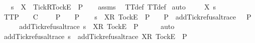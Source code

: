 \ \ \ {\isachardoublequoteopen}s\ {\isacharat}\ {\isacharbrackleft}{\isacharbrackleft}X\ {\isasymunion}\ {\isacharbraceleft}Tick{\isacharbraceright}{\isacharbrackright}\isactrlsub R{\isacharcomma}{\isacharbrackleft}Tock{\isacharbrackright}\isactrlsub E{\isacharbrackright}\ {\isasymin}\ P{\isachardoublequoteclose}\isanewline
%
\isadelimproof
\ \ %
\endisadelimproof
%
\isatagproof
{}\isamarkupfalse%
\ assms\ \isamarkupfalse%
\ TT{}{\isacharunderscore}def\ TT{}{\isacharunderscore}def\isanewline
{}\isamarkupfalse%
\ {\isacharparenleft}auto{\isacharparenright}\isanewline
\ \ \isamarkupfalse%
\ {\isasymrho}\ X\ s\isanewline
\ \ \isamarkupfalse%
\ TT{}{\isacharunderscore}P{\isacharcolon}\ {\isachardoublequoteopen}{\isasymforall}{\isasymrho}{\isachardot}\ {\isacharparenleft}{\isasymexists}{\isasymsigma}{\isachardot}\ {\isasymrho}\ {\isasymlesssim}\isactrlsub C\ {\isasymsigma}\ {\isasymand}\ {\isasymsigma}\ {\isasymin}\ P{\isacharparenright}\ {\isasymlongrightarrow}\ {\isasymrho}\ {\isasymin}\ P{\isachardoublequoteclose}\isanewline
\ \ \isamarkupfalse%
\ {\isachardoublequoteopen}s\ {\isacharat}\ {\isacharbrackleft}{\isacharbrackleft}X{\isacharbrackright}\isactrlsub R{\isacharcomma}\ {\isacharbrackleft}Tock{\isacharbrackright}\isactrlsub E{\isacharbrackright}\ {\isasymin}\ P{\isachardoublequoteclose}\ {\isachardoublequoteopen}{\isasymforall}{\isasymrho}{\isachardot}\ {\isasymrho}\ {\isasymin}\ P\ {\isasymlongrightarrow}\ add{\isacharunderscore}Tick{\isacharunderscore}refusal{\isacharunderscore}trace\ {\isasymrho}\ {\isasymin}\ P{\isachardoublequoteclose}\isanewline
\ \ \isamarkupfalse%
\ \isamarkupfalse%
\ {\isachardoublequoteopen}add{\isacharunderscore}Tick{\isacharunderscore}refusal{\isacharunderscore}trace\ {\isacharparenleft}s\ {\isacharat}\ {\isacharbrackleft}{\isacharbrackleft}X{\isacharbrackright}\isactrlsub R{\isacharcomma}\ {\isacharbrackleft}Tock{\isacharbrackright}\isactrlsub E{\isacharbrackright}{\isacharparenright}\ {\isasymin}\ P{\isachardoublequoteclose}\isanewline
\ \ \ \ \isamarkupfalse%
\ auto\isanewline
\ \ \isamarkupfalse%
\ \isamarkupfalse%
\ {\isachardoublequoteopen}add{\isacharunderscore}Tick{\isacharunderscore}refusal{\isacharunderscore}trace\ s\ {\isacharat}\ add{\isacharunderscore}Tick{\isacharunderscore}refusal{\isacharunderscore}trace\ {\isacharparenleft}{\isacharbrackleft}{\isacharbrackleft}X{\isacharbrackright}\isactrlsub R{\isacharcomma}\ {\isacharbrackleft}Tock{\isacharbrackright}\isactrlsub E{\isacharbrackright}{\isacharparenright}\ {\isasymin}\ P{\isachardoublequoteclose}\isanewline
